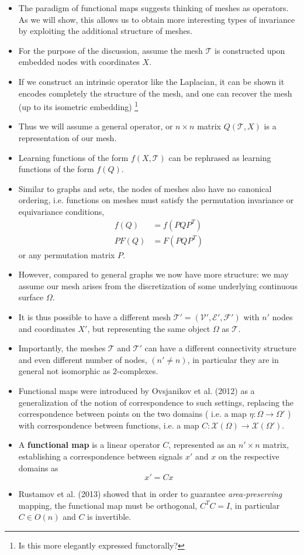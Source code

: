 \documentclass[12pt]{article}
\numberwithin{equation}{section}
\theoremstyle{definition}
\newcommand{		\cX		}	{	\mathcal{X}				}
\newcommand{		\eq		}[1]	{	\begin{align*}#1\end{align*}	}%
\newcommand{		\B		}	{\textbf					} %
\newcommand{		\Oh		}	{	\Omega					}
\newcommand{		\1		}	{	\bm{1}					}%
\begin{document}
\begin{itemize}
\item The paradigm of functional maps suggests thinking of meshes as operators. As we will show, this allows us to obtain more interesting types of invariance by exploiting the additional structure of meshes.
\item For the purpose of the discussion, assume the mesh $\mathcal{T}$ is constructed upon embedded nodes with coordinates $X$. 
\item If we construct an intrinsic operator like the Laplacian, it can be shown it encodes completely the structure of the mesh, and one can recover the mesh (up to its isometric embedding) \footnote{ Is this more elegantly expressed functorally?} 
\item Thus we will assume a general operator, or $n \times n$ matrix $Q(\mathcal{T}, X)$ is a representation of our mesh. 
\item Learning functions of the form $f(X, \mathcal{T})$ can be rephrased as learning functions of the form $f(Q)$. 
\item Similar to graphs and sets, the nodes of meshes also have no canonical ordering, i.e. functions on meshes must satisfy the permutation invariance or equivariance conditions,
\eq{
f(Q) &= f(PQP^T) \\
PF(Q) &= F(PQP^T)
}
or any permutation matrix $P$.
\item However, compared to general graphs we now have more structure: we may assume our mesh arises from the discretization of some underlying continuous surface $\Oh$. 
\item It is thus possible to have a different mesh $\mathcal{T} '= (\mathcal{V}', \mathcal{E}', \mathcal{F}')$ with $n'$ nodes and coordinates $X'$, but representing the same object $\Oh$ as $\mathcal{T}$.
\item Importantly, the meshes $\mathcal{T}$ and $\mathcal{T}'$ can have a different connectivity structure and even different number of nodes, $(n' \neq n)$, in particular they are in general not isomorphic as $2$-complexes.  
\item Functional maps were introduced by Ovsjanikov et al. (2012) as a generalization of the notion of correspondence to such settings, replacing the correspondence between points on the two domains ( i.e. a map $\eta : \Oh \to \Oh'$ ) with correspondence between functions, i.e. a map $C : \cX(\Oh) \to \cX(\Oh')$. 
\item A \B{functional map} is a linear operator $C$, represented as an $n' \times n$ matrix, establishing a correspondence between signals $x'$ and $x$ on the respective domains as
$$
x' = Cx
$$ 
\item Rustamov et al. (2013) showed that in order to guarantee \emph{area-preserving} mapping, the functional map must be orthogonal, $C^T C = I$, in particular $C \in O(n)$ and $C$ is invertible.


\end{itemize}
\end{document}
